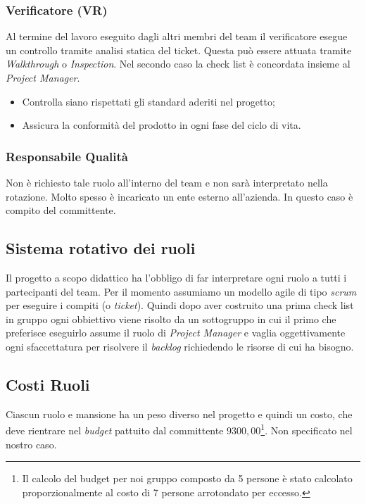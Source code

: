 \documentclass[12pt,a4paper,titlepage]{article}
\begin{document}
\subsubsection{Verificatore (VR)} 
Al termine del lavoro eseguito dagli altri membri del team il verificatore esegue un controllo tramite analisi statica del ticket. Questa può essere attuata tramite \textit{Walkthrough} o \textit{Inspection}. Nel secondo caso la check list è concordata insieme al \textit{Project Manager}. 
\begin{itemize}
	\item Controlla siano rispettati gli standard aderiti nel progetto;
	\item Assicura la conformità del prodotto in ogni fase del ciclo di vita.
\end{itemize}
\subsubsection{Responsabile Qualità} 
Non è richiesto tale ruolo all'interno del team e non sarà interpretato nella rotazione. Molto spesso è incaricato un ente esterno all'azienda. In questo caso è compito del committente.
\subsection{Sistema rotativo dei ruoli}
Il progetto a scopo didattico ha l'obbligo di far interpretare ogni ruolo a tutti i partecipanti del team. Per il momento assumiamo un modello agile di tipo \textit{scrum} per eseguire i compiti (o \textit{ticket}). Quindi dopo aver costruito una prima check list in gruppo ogni obbiettivo viene risolto da un sottogruppo in cui il primo che preferisce eseguirlo assume il ruolo di \textit{Project Manager} e vaglia oggettivamente ogni sfaccettatura per risolvere il \textit{backlog} richiedendo le risorse di cui ha bisogno.
\subsection{Costi Ruoli}
Ciascun ruolo e mansione ha un peso diverso nel progetto e quindi un costo, che deve rientrare nel \textit{budget} pattuito dal committente $9300,00$\footnote{Il calcolo del budget per noi gruppo composto da 5 persone è stato calcolato proporzionalmente al costo di 7 persone arrotondato per eccesso.}. Non specificato nel nostro caso.
\end{document}
